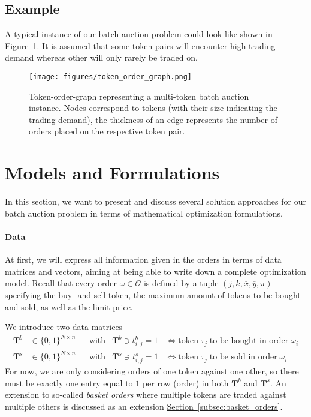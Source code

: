 \documentclass[11pt,parskip=full]{scrartcl}%
\newcommand*{\orders}{\mathcal{O}}          %
\newcommand*{\figref}[1]{\hyperref[{#1}]{Figure~\ref*{#1}}}
\newcommand*{\secref}[1]{\hyperref[{#1}]{Section~\ref*{#1}}}
\begin{document}
\newpage
\subsection{Example}

A typical instance of our batch auction problem could look like shown in 
\figref{fig:order-token-graph}.
It is assumed that some token pairs will encounter high trading demand whereas other will only
rarely be traded on.

\begin{figure}[h!]
  \centering
  \texttt{[image: figures/token\_order\_graph.png]}
  \caption{Token-order-graph representing a multi-token batch auction instance. Nodes correspond
  to tokens (with their size indicating the trading demand), the thickness of an edge represents 
  the number of orders placed on the respective token pair.}
  \label{fig:order-token-graph}
\end{figure}


\clearpage
\section{Models and Formulations}
\label{sec:models}

In this section, we want to present and discuss several solution approaches for our batch auction
problem in terms of mathematical optimization formulations.

\vspace{-.2cm}
\paragraph{Data}

At first, we will express all information given in the orders in terms of data matrices and
vectors, aiming at being able to write down a complete optimization model.
Recall that every order $ \omega \in \orders $ is defined by a tuple
$ (j,k,\overline{x},\overline{y},\pi) $ specifying the buy- and sell-token, the maximum amount of
tokens to be bought and sold, as well as the limit price.

We introduce two data matrices
\begin{align*}
  \mathbf{T}^b &\in \{0,1\}^{N \times n} && \text{with} & \mathbf{T}^b \ni t^b_{i,j} = 1
  &\Leftrightarrow
  \text{token} \; \tau_j \; \text{to be bought in order} \; \omega_i \\
  \mathbf{T}^s &\in \{0,1\}^{N \times n} && \text{with} & \mathbf{T}^s \ni t^s_{i,j} = 1
  &\Leftrightarrow
  \text{token} \; \tau_j \; \text{to be sold in order} \; \omega_i
\end{align*}
For now, we are only considering orders of one token against one other, so there must be exactly
one entry equal to $ 1 $ per row (order) in both $ \mathbf{T}^b $ and $ \mathbf{T}^s $.
An extension to so-called \emph{basket orders} where multiple tokens are traded against multiple
others is discussed as an extension \secref{subsec:basket_orders}.
\end{document}
